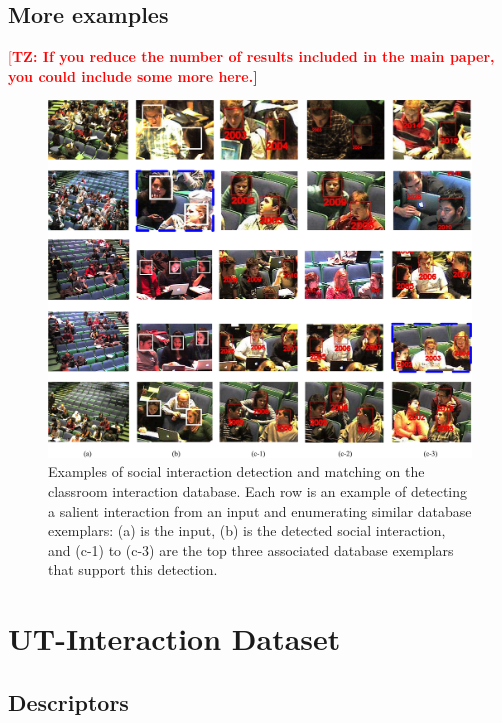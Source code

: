 \documentclass[10pt,twocolumn,letterpaper]{article}
\newcommand{\todd}[1]{\textcolor{red}{[\bf TZ: #1]}}
\begin{document}
\subsection{More examples}

\todd{If you reduce the number of results included in the main paper, you could include some more here.}

\begin{figure}
\begin{center}
\includegraphics[scale=2.25]{retrieved.png}
\end{center}
\vspace{-10pt}
\caption{Examples of social interaction detection and matching on the classroom interaction database. Each row is an example of detecting a salient interaction from an input and enumerating similar database exemplars: (a) is the input, (b) is the detected social interaction, and (c-1) to (c-3) are the top three associated database exemplars that support this detection.}
\label{retrieved}
\end{figure}

\section{UT-Interaction Dataset}

\subsection{Descriptors}
\end{document}
